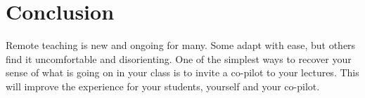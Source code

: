 \documentclass[sigconf,natbib=false]{acmart}
\begin{document}
\section{Conclusion}

Remote teaching is new and ongoing for many. Some adapt with ease, but others find it uncomfortable and disorienting. One of the simplest ways to recover your sense of what is going on in your class is to invite a co-pilot to your lectures. This will improve the experience for your students, yourself and your co-pilot.

\printbibliography
\end{document}
